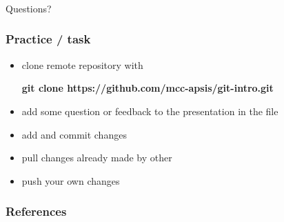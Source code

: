 \documentclass{beamer}
\newcommand{\code}[1]{{\fontfamily{pcr}\selectfont \textbf{#1}}}
\begin{document}
\begin{frame}
\frametitle{}

{\huge
Questions?
}

\end{frame}

\begin{frame}
\frametitle{Practice / task}

\begin{itemize}
\item clone remote repository with

\code{git clone https://github.com/mcc-apsis/git-intro.git}

\item add some question or feedback to the presentation in the file

\item add and commit changes

\item pull changes already made by other

\item push your own changes
\end{itemize}




\end{frame}


\begin{frame}
\frametitle{References}



\end{frame}
\end{document}
